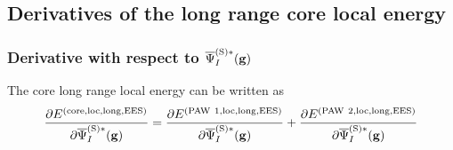 \documentclass[paper=a4, fontsize=11pt]{article} %
\numberwithin{equation}{section} %
\numberwithin{figure}{section} %
\numberwithin{table}{section} %
\newcommand{\p}{\partial}
\newcommand{\bg}{{\bf{g}}}
\newcommand{\rS}{{\mathrm{S}}}
\newcommand{\rEES}{{\mathrm{EES}}}
\newcommand{\rcore}{{\mathrm{core}}}
\newcommand{\rlong}{{\mathrm{long}}}
\newcommand{\rP}{{\mathrm{PAW}}}
\newcommand{\rlo}{{\mathrm{loc}}}
\newcommand{\psigsc}{{\overline \Psi_I^{(\rS)*}(\bg)}}
\begin{document}
\newpage



\subsection{Derivatives of the long range core local  energy}
\subsubsection{Derivative with respect to $\psigsc$}
The $\rcore$ long range local energy can be written as
\begin{equation}
\frac{\p E^{(\rcore,\rlo,\rlong,\rEES)}}{\p \psigsc}
= \frac{\p E^{(\rP\ 1,\rlo,\rlong,\rEES)}}{\p \psigsc}
+ \frac{\p E^{(\rP\ 2,\rlo,\rlong,\rEES)}}{\p \psigsc}
\end{equation}
\end{document}

